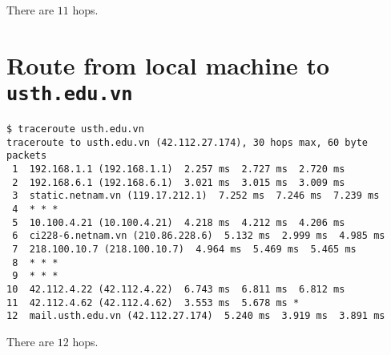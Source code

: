 \documentclass[12pt]{article}
\begin{document}
There are $11$ hops.


\section{Route from local machine to \texttt{usth.edu.vn}}

\begin{lstlisting}[breaklines]
$ traceroute usth.edu.vn
traceroute to usth.edu.vn (42.112.27.174), 30 hops max, 60 byte packets
 1  192.168.1.1 (192.168.1.1)  2.257 ms  2.727 ms  2.720 ms
 2  192.168.6.1 (192.168.6.1)  3.021 ms  3.015 ms  3.009 ms
 3  static.netnam.vn (119.17.212.1)  7.252 ms  7.246 ms  7.239 ms
 4  * * *
 5  10.100.4.21 (10.100.4.21)  4.218 ms  4.212 ms  4.206 ms
 6  ci228-6.netnam.vn (210.86.228.6)  5.132 ms  2.999 ms  4.985 ms
 7  218.100.10.7 (218.100.10.7)  4.964 ms  5.469 ms  5.465 ms
 8  * * *
 9  * * *
10  42.112.4.22 (42.112.4.22)  6.743 ms  6.811 ms  6.812 ms
11  42.112.4.62 (42.112.4.62)  3.553 ms  5.678 ms *
12  mail.usth.edu.vn (42.112.27.174)  5.240 ms  3.919 ms  3.891 ms
\end{lstlisting}

There are $12$ hops.

\end{document}
